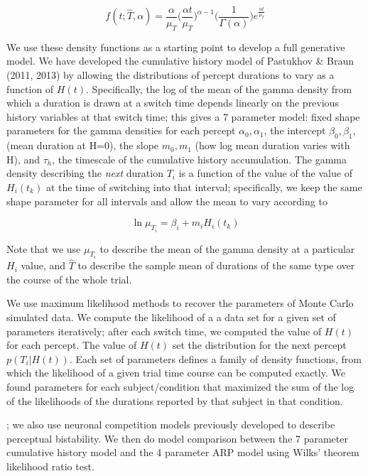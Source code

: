 \begin{equation}
f(t; \hat{T},\alpha) = \frac{\alpha}{\mu_{T}}\bigg(\frac{\alpha t}{\mu_{T}}\bigg)^{\alpha-1}\bigg(\frac{1}{\Gamma(\alpha)}\bigg)e^{\frac{\alpha t}{\mu_{T}}}
\label{ch3:gamma}
\end{equation}

We use these density functions as a starting point to develop a full generative model. We have developed the cumulative history model of Pastukhov \& Braun (2011, 2013) by allowing the distributions of percept durations to vary as a function of $H(t)$. Specifically, the log of the mean of the gamma density from which a duration is drawn at a switch time depends linearly on the previous history variables at that switch time; this gives a 7 parameter model: fixed shape parameters for the gamma densities for each percept $\alpha_0, \alpha_1$, the intercept $\beta_0, \beta_1$, (mean duration at H=0), the slope $m_0, m_1$ (how log mean duration varies with H), and $\tau_h$, the timescale of the cumulative history accumulation. The gamma density describing the \textit{next} duration $T_i $ is a function of the value of the value of $H_i (t_k)$ at the time of switching into that interval; specifically, we keep the same shape parameter for all intervals and allow the mean to vary according to

\begin{equation}
\ln \mu_{T_i} = \beta_i + m_i H_i(t_k)
\end{equation}

Note that we use $\mu_{T_i}$ to describe the mean of the gamma density at a particular $H_i$ value, and $\hat{T}$ to describe the sample mean of durations of the same type over the course of the whole trial. 

We use maximum likelihood methods to recover the parameters of Monte Carlo simulated data. We compute the likelihood of a a data set for a given set of parameters iteratively; after each switch time, we computed the value of $H(t)$ for each percept. The value of $H(t)$ set the distribution for the next percept $p(T_i|H(t))$. Each set of parameters defines a family of density functions, from which the likelihood of a given trial time course can be computed exactly. We found parameters for each subject/condition that maximized the sum of the log of the likelihoods of the durations reported by that subject in that condition. 


; we also use neuronal competition models previously developed to describe perceptual bistability.%
We then do model comparison between the 7 parameter cumulative history model and the 4 parameter ARP model using Wilks' theorem likelihood ratio test.

